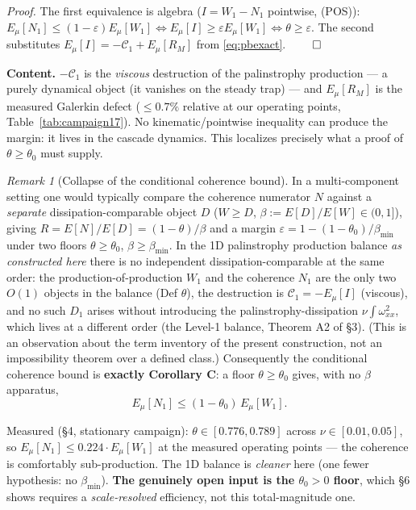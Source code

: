 \documentclass[11pt]{article}
\theoremstyle{remark}
\newtheorem{remark}[theorem]{Remark}
\theoremstyle{plain}
\newcommand{\eqdef}{:=}
\begin{document}
\emph{Proof.} The first equivalence is algebra ($I = W_1 - N_1$ pointwise, (POS)):
$E_\mu[N_1] \le (1-\varepsilon)E_\mu[W_1] \iff E_\mu[I] \ge \varepsilon E_\mu[W_1]
\iff \theta \ge \varepsilon$. The second substitutes
$E_\mu[I] = -\mathcal{C}_1 + E_\mu[R_M]$ from \eqref{eq:pbexact}. $\qed$

\textbf{Content.} $-\mathcal{C}_1$ is the \emph{viscous} destruction of the
palinstrophy production --- a purely dynamical object (it vanishes on the steady
trap) --- and $E_\mu[R_M]$ is the measured Galerkin defect ($\le 0.7\%$ relative at our
operating points, Table~\ref{tab:campaign17}). No kinematic/pointwise inequality can produce the margin: it lives in
the cascade dynamics. This localizes precisely what a proof of $\theta \ge \theta_0$ must supply.

\begin{remark}[Collapse of the conditional coherence bound]\label{rem:noD}
In a multi-component setting one would typically compare the coherence numerator $N$
against a \emph{separate} dissipation-comparable object $D$ ($W \ge D$,
$\beta \eqdef E[D]/E[W] \in (0,1]$), giving $R = E[N]/E[D] = (1-\theta)/\beta$ and a
margin $\varepsilon = 1 - (1-\theta_0)/\beta_{\min}$ under two floors $\theta \ge \theta_0$,
$\beta \ge \beta_{\min}$. In the 1D palinstrophy production balance \emph{as constructed
here} there is no independent
dissipation-comparable at the same order: the production-of-production $W_1$ and
the coherence $N_1$ are the only two $O(1)$ objects in the balance (Def $\theta$), the
destruction is $\mathcal{C}_1 = -E_\mu[I]$ (viscous), and no such $D_1$ arises
without introducing the palinstrophy-dissipation $\nu\int\omega_{xx}^2$, which lives at a
different order (the Level-1 balance, Theorem A2 of \S3). (This is an observation about
the term inventory of the present construction, not an impossibility theorem over a
defined class.) Consequently the conditional
coherence bound is \textbf{exactly Corollary C}: a floor $\theta \ge \theta_0$ gives, with no $\beta$
apparatus,
\begin{equation}
   E_\mu[N_1] \le (1 - \theta_0)\, E_\mu[W_1].
\end{equation}
\end{remark}

Measured (\S4, stationary campaign): $\theta \in [0.776, 0.789]$ across $\nu \in [0.01, 0.05]$, so
$E_\mu[N_1] \le 0.224 \cdot E_\mu[W_1]$ at the measured operating points --- the coherence is
comfortably sub-production. The 1D balance is \emph{cleaner} here (one fewer
hypothesis: no $\beta_{\min}$). \textbf{The genuinely open input is the $\theta_0 > 0$ floor},
which \S6 shows requires a \emph{scale-resolved} efficiency, not
this total-magnitude one.
\end{document}
